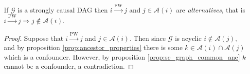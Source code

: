 \documentclass[12pt]{article}
\def\pwgc{\overset{\text{PW}}{\rightarrow}}  %
\def\gcg{\mathcal{G}}  %
\newcommand{\anc}[1]{\mathcal{A}(#1)}  %
\newcommand{\gcgpath}[2]{#1 \rightarrow \cdots \rightarrow #2}  %
\begin{document}
\begin{corollary}
  \label{cor:parent_corollary}
  If $\gcg$ is a strongly causal DAG then $i \pwgc j$ and $j \in \anc{i}$ are
  \textit{alternatives}, that is $i \pwgc j \Rightarrow j \notin \anc{i}$.
\end{corollary}
\begin{proof}
  Suppose that $i \pwgc j$ and $j \in \anc{i}$.  Then since $\gcg$ is
  acyclic $i \not\in \anc{j}$, and by proposition
  \ref{prop:ancestor_properties} there is some
  $k \in \anc{i}\cap\anc{j}$ which is a confounder.  However, by
  proposition \ref{prop:sc_graph_common_anc} $k$ cannot be a
  confounder, a contradiction.
\end{proof}



  
\end{document}
